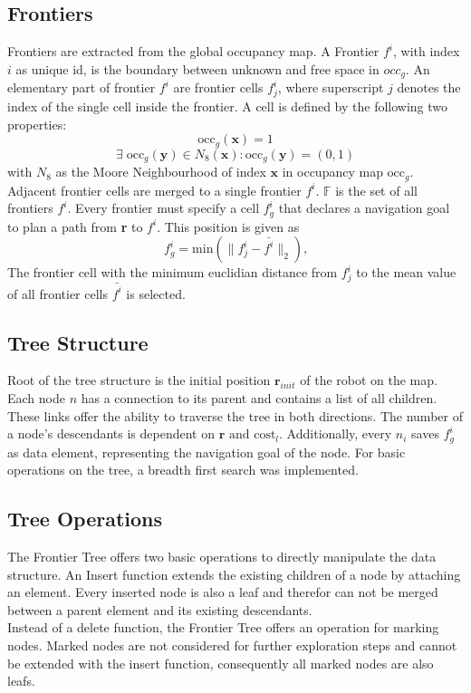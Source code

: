 \documentclass[twocolumn]{svjour3}[2016]
\begin{document}
\subsection{Frontiers}
\label{frontiers}
Frontiers are extracted from the global occupancy map. A Frontier $f^i$, with index $i$ as unique id, is the boundary between unknown and free space in $occ_g$\cite{brian_yamauchi_frontier-based_2007}. An elementary part of frontier $f^i$ are frontier cells $f^i_j$, where superscript $j$ denotes the index of the single cell inside the frontier. A cell is defined by the following two properties:
\begin{equation}
\textrm{occ}_{g}(\textbf{x}) = 1
\end{equation}
\begin{equation}
\exists\; \textrm{occ}_{g}(\textbf{y})\in N_8(\textbf{x}):\textrm{occ}_{g}(\textbf{y})=(0,1)
\end{equation}
with $N_8$ as the Moore Neighbourhood of index $\textbf{x}$ in occupancy map $\textrm{occ}_g$. Adjacent frontier cells are merged to a single frontier $f^i$. $\mathbb{F}$ is the set of all frontiers $f^i$. Every frontier must specify a cell $f^i_g$ that declares a navigation goal to plan a path from \textbf{r} to $f^i$. This position is given as
\begin{equation}
f^i_g = \textrm{min}(\|f^i_j - \bar{f^i}\|_2)\text{,}
\end{equation}
The frontier cell with the minimum euclidian distance from $f^i_j$ to the mean value of all frontier cells $\bar{f^i}$ is selected.

\subsection{Tree Structure}
Root of the tree structure is the initial position $\textbf{r}_{init}$ of the robot on the map. Each node $n$ has a connection to its parent and contains a list of all children. These links offer the ability to traverse the tree in both directions. The number of a node's descendants is dependent on $\textbf{r}\text{ and }\textrm{cost}_l$. Additionally, every $n_i$ saves $f^i_g$ as data element, representing the navigation goal of the node. For basic operations on the tree, a breadth first search was implemented.

\subsection{Tree Operations}
The Frontier Tree offers two basic operations to directly manipulate the data structure. An Insert function extends the existing children of a node by attaching an element. Every inserted node is also a leaf and therefor can not be merged between a parent element and its existing descendants.\\
Instead of a delete function, the Frontier Tree offers an operation for marking nodes. Marked nodes are not considered for further exploration steps and cannot be extended with the insert function, consequently all marked nodes are also leafs.\\
\end{document}
